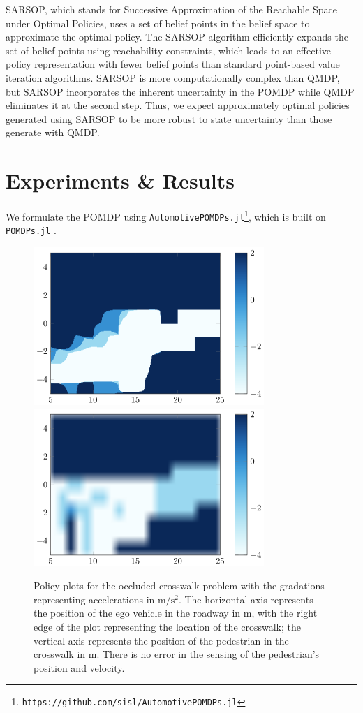 \documentclass[conference]{IEEEtran}
\begin{document}
SARSOP, which stands for Successive Approximation of the Reachable Space under Optimal Policies, uses a set of belief points in the belief space to approximate the optimal policy. The SARSOP algorithm efficiently expands the set of belief points using reachability constraints, which leads to an effective policy representation with fewer belief points than standard point-based value iteration algorithms. SARSOP is more computationally complex than QMDP, but SARSOP incorporates the inherent uncertainty in the POMDP while QMDP eliminates it at the second step. Thus, we expect approximately optimal policies generated using SARSOP to be more robust to state uncertainty than those generate with QMDP.


\section{Experiments \& Results}
\label{sec:experiments-results}

We formulate the POMDP using \texttt{AutomotivePOMDPs.jl}\footnote{\texttt{https://github.com/sisl/AutomotivePOMDPs.jl}}, which is built on \texttt{POMDPs.jl} \cite{Egorov2017POMDPs.jl:Uncertainty}.

\begin{figure}[tbph]
    \centerline{
        \includegraphics[width=0.5\linewidth]{src/plots/qmdp_0_00001_noise_0_01_no_labels.png}
        \includegraphics[width=0.5\linewidth]{src/plots/sarsop_0_01_1000_noise_0_01_no_labels.png}
    }
    \caption{Policy plots for the occluded crosswalk problem with the gradations representing accelerations in $\si{\meter\per\square\second}$. The horizontal axis represents the position of the ego vehicle in the roadway in $\si{\meter}$, with the right edge of the plot representing the location of the crosswalk; the vertical axis represents the position of the pedestrian in the crosswalk in $\si{\meter}$.  There is no error in the sensing of the pedestrian's position and velocity.}
    \label{fig:qmdp_sarsop_1}
\end{figure}
\end{document}
